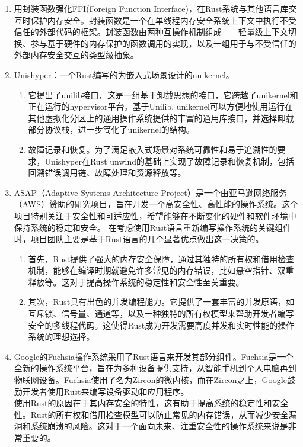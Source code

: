 \documentclass{ctexart}
\begin{document}
\begin{enumerate}
\item 用封装函数强化FFI(Foreign Function Interface)，在Rust系统与其他语言库交互时保护内存安全。封装函数是一个在单线程内存安全系统上下文中执行不受信任的外部代码的框架。封装函数由两种互操作机制组成——轻量级上下文切换、参与基于硬件的内存保护的函数调用的实现，以及一组用于与不受信任的外部内存安全交互的类型级抽象。

\item Unishyper：一个Rust编写的为嵌入式场景设计的unikernel。
\begin{enumerate}
\item 
它提出了unilib接口，这是一组基于卸载思想的接口，它跨越了unikernel和正在运行的hypervisor平台。基于Unilib, unikernel可以方便地使用运行在其他虚拟化分区上的通用操作系统提供的丰富的通用库接口，并选择卸载部分协议栈，进一步简化了unikernel的结构。
\item 
故障记录和恢复。为了满足嵌入式场景对系统可靠性和易于追溯性的要求，Unishyper在Rust unwind的基础上实现了故障记录和恢复机制，包括回溯错误调用链、故障处理和资源释放等。
\end{enumerate}
\item ASAP（Adaptive Systems Architecture Project）是一个由亚马逊网络服务（AWS）赞助的研究项目，旨在开发一个高安全性、高性能的操作系统。这个项目特别关注于安全性和可适应性，希望能够在不断变化的硬件和软件环境中保持系统的稳定和安全。 在考虑使用Rust语言重新编写操作系统的关键组件时，项目团队主要是基于Rust语言的几个显著优点做出这一决策的。
\begin{enumerate}
\item 首先，Rust提供了强大的内存安全保障，通过其独特的所有权和借用检查机制，能够在编译时期就避免许多常见的内存错误，比如悬空指针、双重释放等。这对于提高操作系统的稳定性和安全性至关重要。
\item 其次，Rust具有出色的并发编程能力。它提供了一套丰富的并发原语，如互斥锁、信号量、通道等，以及一种独特的所有权模型来帮助开发者编写安全的多线程代码。这使得Rust成为开发需要高度并发和实时性能的操作系统的理想选择。
\end{enumerate}
\item Google的Fuchsia操作系统采用了Rust语言来开发其部分组件。Fuchsia是一个全新的操作系统平台，旨在为多种设备提供支持，从智能手机到个人电脑再到物联网设备。Fuchsia使用了名为Zircon的微内核，而在Zircon之上，Google鼓励开发者使用Rust来编写设备驱动和应用程序。\\
使用Rust的原因在于其内存安全的特性，这有助于提高系统的稳定性和安全性。Rust的所有权和借用检查模型可以防止常见的内存错误，从而减少安全漏洞和系统崩溃的风险。这对于一个面向未来、注重安全性的操作系统来说是非常重要的。\\

\end{enumerate}
\end{document}
